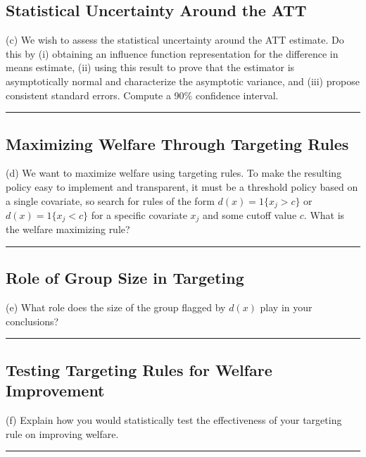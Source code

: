 \documentclass{article}
\newenvironment{colorparagraph}[1]{\par\color{#1}}{\par}
\begin{document}
\begin{colorparagraph}{questioncolor}
\label{q4d}\subsection{Statistical Uncertainty Around the ATT}
(c) We wish to assess the statistical uncertainty around the ATT estimate. Do this by (i) obtaining an influence function representation for the difference in means estimate, (ii) using this result to prove that the estimator is asymptotically normal and characterize the asymptotic variance, and (iii) propose consistent standard errors. Compute a 90\% confidence interval.

\rule{\textwidth}{0.5pt}
\end{colorparagraph}

\begin{colorparagraph}{questioncolor}
\label{q4e}\subsection{Maximizing Welfare Through Targeting Rules}
(d) We want to maximize welfare using targeting rules. To make the resulting policy easy to implement and transparent, it must be a threshold policy based on a single covariate, so search for rules of the form \( d(x) = 1\{x_j > c\} \) or \( d(x) = 1\{x_j < c\} \) for a specific covariate \( x_j \) and some cutoff value \( c \). What is the welfare maximizing rule?

\rule{\textwidth}{0.5pt}
\end{colorparagraph}

\begin{colorparagraph}{questioncolor}
\label{q4f}\subsection{Role of Group Size in Targeting}
(e) What role does the size of the group flagged by \( d(x) \) play in your conclusions?

\rule{\textwidth}{0.5pt}
\end{colorparagraph}

\begin{colorparagraph}{questioncolor}
\label{q4g}\subsection{Testing Targeting Rules for Welfare Improvement}
(f) Explain how you would statistically test the effectiveness of your targeting rule on improving welfare.

\rule{\textwidth}{0.5pt}
\end{colorparagraph}
\end{document}
